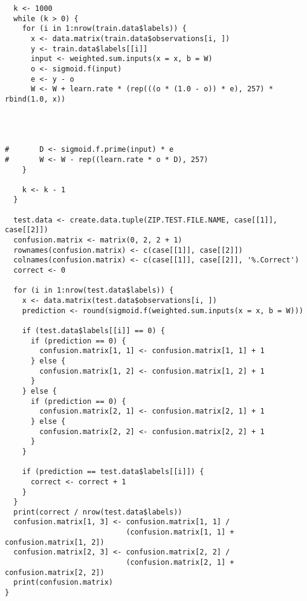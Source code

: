 \documentclass{article}
\begin{document}
\begin{verbatim}
  k <- 1000
  while (k > 0) {
    for (i in 1:nrow(train.data$labels)) {
      x <- data.matrix(train.data$observations[i, ])
      y <- train.data$labels[[i]]
      input <- weighted.sum.inputs(x = x, b = W)
      o <- sigmoid.f(input)
      e <- y - o
      W <- W + learn.rate * (rep(((o * (1.0 - o)) * e), 257) * rbind(1.0, x))




#       D <- sigmoid.f.prime(input) * e
#       W <- W - rep((learn.rate * o * D), 257)
    }

    k <- k - 1
  }

  test.data <- create.data.tuple(ZIP.TEST.FILE.NAME, case[[1]], case[[2]])
  confusion.matrix <- matrix(0, 2, 2 + 1)
  rownames(confusion.matrix) <- c(case[[1]], case[[2]])
  colnames(confusion.matrix) <- c(case[[1]], case[[2]], '%.Correct')
  correct <- 0

  for (i in 1:nrow(test.data$labels)) {
    x <- data.matrix(test.data$observations[i, ])
    prediction <- round(sigmoid.f(weighted.sum.inputs(x = x, b = W)))

    if (test.data$labels[[i]] == 0) {
      if (prediction == 0) {
        confusion.matrix[1, 1] <- confusion.matrix[1, 1] + 1
      } else {
        confusion.matrix[1, 2] <- confusion.matrix[1, 2] + 1
      }
    } else {
      if (prediction == 0) {
        confusion.matrix[2, 1] <- confusion.matrix[2, 1] + 1
      } else {
        confusion.matrix[2, 2] <- confusion.matrix[2, 2] + 1
      }
    }

    if (prediction == test.data$labels[[i]]) {
      correct <- correct + 1
    }
  }
  print(correct / nrow(test.data$labels))
  confusion.matrix[1, 3] <- confusion.matrix[1, 1] /
                            (confusion.matrix[1, 1] + confusion.matrix[1, 2])
  confusion.matrix[2, 3] <- confusion.matrix[2, 2] /
                            (confusion.matrix[2, 1] + confusion.matrix[2, 2])
  print(confusion.matrix)
}
\end{verbatim}
\end{document}
